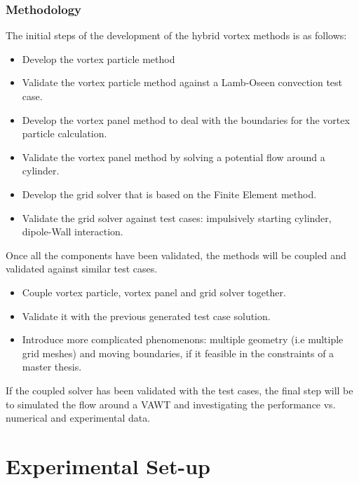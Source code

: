 \subsubsection*{Methodology}

The initial steps of the development of the hybrid vortex methods is as follows:

\begin{itemize}
\item Develop the vortex particle method
\item Validate the vortex particle method against a Lamb-Oseen convection test case.
\item Develop the vortex panel method to deal with the boundaries for the vortex particle calculation. 
\item Validate the vortex panel method by solving a potential flow around a cylinder.
\item Develop the grid solver that is based on the Finite Element method. 
\item Validate the grid solver against test cases: impulsively starting cylinder, dipole-Wall interaction.
\end{itemize}

Once all the components have been validated, the methods will be coupled and validated against similar test cases.\\

\begin{itemize}
\item Couple vortex particle, vortex panel and grid solver together.
\item Validate it with the previous generated test case solution.
\item Introduce more complicated phenomenons: multiple geometry (i.e multiple grid meshes) and moving boundaries, if it feasible in the constraints of a master thesis.
\end{itemize}

If the coupled solver has been validated with the test cases, the final step will be to simulated the flow around a VAWT and investigating the performance vs. numerical and experimental data.\\

\section{Experimental Set-up}
\label{sec:experiment}


